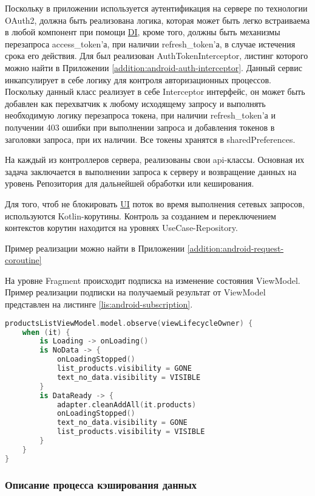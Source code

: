 Поскольку в приложении используется аутентификация на сервере по технологии OAuth2, должна быть реализована логика, которая может быть легко встраиваема в любой компонент при помощи \hyperlink{gloss:di}{DI}, кроме того, должны быть механизмы перезапроса access\_token’а, при наличии refresh\_token’а, в случае истечения срока его действия.
Для был реализован AuthTokenInterceptor, листинг которого можно найти в Приложении \ref{addition:android-auth-interceptor}.
Данный сервис инкапсулирует в себе логику для контроля авторизационных процессов.
Поскольку данный класс реализует в себе Interceptor интерфейс, он может быть добавлен как перехватчик к любому исходящему запросу и выполнять необходимую логику перезапроса токена, при наличии refresh\_token’а и получении 403 ошибки при выполнении запроса и добавления токенов в заголовки запроса, при их наличии.
Все токены хранятся в sharedPreferences.

На каждый из контроллеров сервера, реализованы свои api-классы.
Основная их задача заключается в выполнении запроса к серверу и возвращение данных на уровень Репозитория для дальнейшей обработки или кеширования.

Для того, чтоб не блокировать \hyperlink{gloss:ui}{UI} поток во время выполнения сетевых запросов, используются Kotlin-корутины.
Контроль за созданием и переключением контекстов корутин находится на уровнях UseCase-Repository.

Пример реализации можно найти в Приложении \ref{addition:android-request-coroutine}

На уровне Fragment происходит подписка на изменение состояния ViewModel.
Пример реализации подписки на получаемый результат от ViewModel представлен на листинге \ref{lis:android-subscription}.

\begin{lstlisting}[language=Kotlin, captionpos=b,
label={lis:android-subscription},
caption={Пример реализации подписки на ViewModel}
]
productsListViewModel.model.observe(viewLifecycleOwner) {
    when (it) {
        is Loading -> onLoading()
        is NoData -> {
            onLoadingStopped()
            list_products.visibility = GONE
            text_no_data.visibility = VISIBLE
        }
        is DataReady -> {
            adapter.cleanAddAll(it.products)
            onLoadingStopped()
            text_no_data.visibility = GONE
            list_products.visibility = VISIBLE
        }
    }
}
\end{lstlisting}

\subsubsection{Описание процесса кэширования данных}\indent

